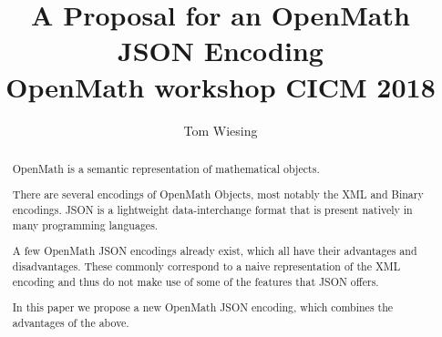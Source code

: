 \documentclass[12pt]{article}
\title{A Proposal for an OpenMath JSON Encoding\\OpenMath workshop CICM 2018}
\author{Tom Wiesing}
\begin{document}
    \maketitle

    \begin{abstract}
        OpenMath is a semantic representation of mathematical objects. 

        There are several encodings of OpenMath Objects, most notably the XML and Binary encodings. 
        JSON is a lightweight data-interchange format that is present natively in many programming languages. 
        
        A few OpenMath JSON encodings already exist, which all have their advantages and disadvantages. 
        These commonly correspond to a naive representation of the XML encoding and thus do not make use of some of the features that JSON offers. 
        
        In this paper we propose a new OpenMath JSON encoding, which combines the advantages of the above. 
    \end{abstract}


    
    
    
    
\end{document}
